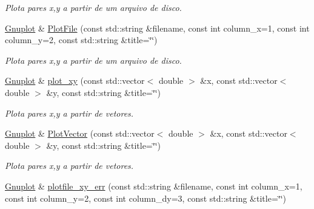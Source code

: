 \begin{DoxyCompactItemize}
\begin{DoxyCompactList}\small\item\em Plota pares x,y a partir de um arquivo de disco. \end{DoxyCompactList}\item 
\hypertarget{classGnuplot_a68d5b282f0fc0d65d432009b55705cbd}{\hyperlink{classGnuplot}{Gnuplot} \& \hyperlink{classGnuplot_a68d5b282f0fc0d65d432009b55705cbd}{Plot\-File} (const std\-::string \&filename, const int column\-\_\-x=1, const int column\-\_\-y=2, const std\-::string \&title=\char`\"{}\char`\"{})}\label{classGnuplot_a68d5b282f0fc0d65d432009b55705cbd}

\begin{DoxyCompactList}\small\item\em Plota pares x,y a partir de um arquivo de disco. \end{DoxyCompactList}\item 
\hypertarget{classGnuplot_a777b6a5474951d6d023dff4237d80a2b}{\hyperlink{classGnuplot}{Gnuplot} \& \hyperlink{classGnuplot_a777b6a5474951d6d023dff4237d80a2b}{plot\-\_\-xy} (const std\-::vector$<$ double $>$ \&x, const std\-::vector$<$ double $>$ \&y, const std\-::string \&title=\char`\"{}\char`\"{})}\label{classGnuplot_a777b6a5474951d6d023dff4237d80a2b}

\begin{DoxyCompactList}\small\item\em Plota pares x,y a partir de vetores. \end{DoxyCompactList}\item 
\hypertarget{classGnuplot_ae282636936128008b2c82f569f607820}{\hyperlink{classGnuplot}{Gnuplot} \& \hyperlink{classGnuplot_ae282636936128008b2c82f569f607820}{Plot\-Vector} (const std\-::vector$<$ double $>$ \&x, const std\-::vector$<$ double $>$ \&y, const std\-::string \&title=\char`\"{}\char`\"{})}\label{classGnuplot_ae282636936128008b2c82f569f607820}

\begin{DoxyCompactList}\small\item\em Plota pares x,y a partir de vetores. \end{DoxyCompactList}\item 
\hypertarget{classGnuplot_a33ab4bb031fa6a6b798c90a9089648e9}{\hyperlink{classGnuplot}{Gnuplot} \& \hyperlink{classGnuplot_a33ab4bb031fa6a6b798c90a9089648e9}{plotfile\-\_\-xy\-\_\-err} (const std\-::string \&filename, const int column\-\_\-x=1, const int column\-\_\-y=2, const int column\-\_\-dy=3, const std\-::string \&title=\char`\"{}\char`\"{})}\label{classGnuplot_a33ab4bb031fa6a6b798c90a9089648e9}


\end{DoxyCompactItemize}
